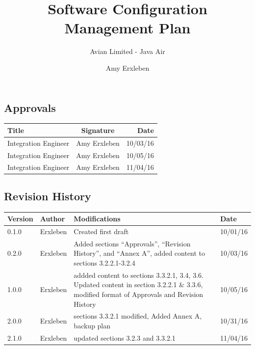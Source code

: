 \documentclass{scrartcl}
\begin{document}
\title{Software Configuration Management Plan}
\subtitle{Avian Limited - Java Air}
\author{Amy Erxleben}

\maketitle
\newpage
\subsection*{Approvals}

\begin{center}
\begin{tabular}{|  l | c | r | }
\hline
  \textbf{Title} & \textbf{Signature} & \textbf{Date} \\ \hline
  Integration Engineer &  \oeschfamily Amy Erxleben & 10/03/16 \\ \hline
  Integration Engineer & \oeschfamily Amy Erxleben & 10/05/16 \\ \hline
  Integration Engineer & \oeschfamily Amy Erxleben & 11/04/16 \\ \hline
\end{tabular}
\end{center}

\subsection*{Revision History}

\begin{center}
\begin{tabular}{| l | l | p{10cm} | l |}
\hline
\textbf{Version} & \textbf{Author} & \textbf{Modifications} & \textbf{Date} \\ \hline
0.1.0 & Erxleben & Created first draft  & 10/01/16 \\ \hline
0.2.0 & Erxleben & Added sections ``Approvals'', ``Revision History'', and ``Annex A'', added content to sections 3.2.2.1-3.2.4 & 10/03/16 \\ \hline
1.0.0 & Erxleben & addded content to sections 3.3.2.1, 3.4, 3.6.  Updated content in section 3.2.2.1 \& 3.3.6, modified format of Approvals and Revision History & 10/05/16 \\ \hline
2.0.0 & Erxleben & sections 3.3.2.1 modified, Added Annex A, backup plan & 10/31/16\\ \hline
2.1.0 & Erxleben & updated sections 3.2.3 and 3.3.2.1 &11/04/16 \\ \hline
\end{tabular}
\end{center}
\newpage
\end{document}
